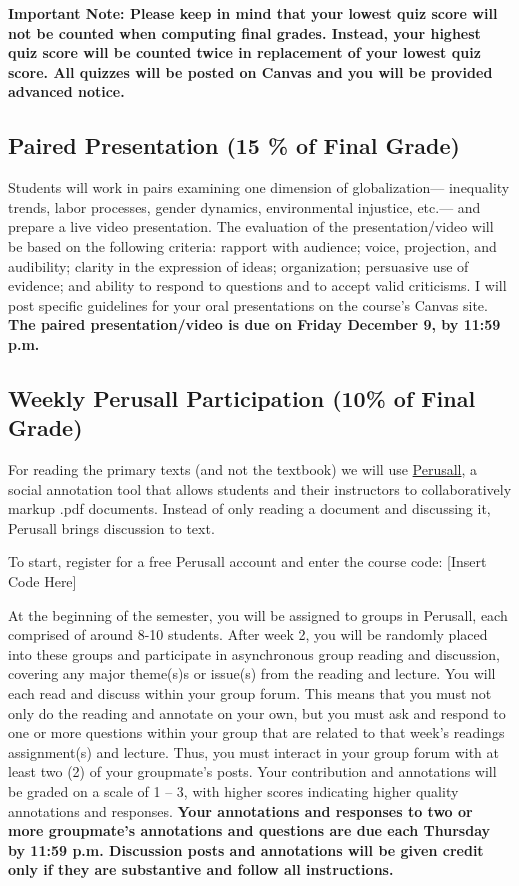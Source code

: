 \documentclass[11pt,]{article}
\begin{document}
\textbf{Important Note: Please keep in mind that your lowest quiz score
will not be counted when computing final grades. Instead, your highest
quiz score will be counted twice in replacement of your lowest quiz
score. All quizzes will be posted on Canvas and you will be provided
advanced notice.}

\hypertarget{paired-presentation-15-of-final-grade}{%
\subsection{Paired Presentation (15 \% of Final
Grade)}\label{paired-presentation-15-of-final-grade}}

Students will work in pairs examining one dimension of globalization---
inequality trends, labor processes, gender dynamics, environmental
injustice, etc.--- and prepare a live video presentation. The evaluation
of the presentation/video will be based on the following criteria:
rapport with audience; voice, projection, and audibility; clarity in the
expression of ideas; organization; persuasive use of evidence; and
ability to respond to questions and to accept valid criticisms. I will
post specific guidelines for your oral presentations on the course's
Canvas site. \textbf{The paired presentation/video is due on Friday
December 9, by 11:59 p.m.}

\hypertarget{perusall}{%
\subsection{Weekly Perusall Participation (10\% of Final
Grade)}\label{perusall}}

For reading the primary texts (and not the textbook) we will use
\href{https://support.perusall.com/hc/en-us}{Perusall}, a social
annotation tool that allows students and their instructors to
collaboratively markup .pdf documents. Instead of only reading a
document and discussing it, Perusall brings discussion to text.

To start, register for a free Perusall account and enter the course
code: {[}Insert Code Here{]}

At the beginning of the semester, you will be assigned to groups in
Perusall, each comprised of around 8-10 students. After week 2, you will
be randomly placed into these groups and participate in asynchronous
group reading and discussion, covering any major theme(s)s or issue(s)
from the reading and lecture. You will each read and discuss within your
group forum. This means that you must not only do the reading and
annotate on your own, but you must ask and respond to one or more
questions within your group that are related to that week's readings
assignment(s) and lecture. Thus, you must interact in your group forum
with at least two (2) of your groupmate's posts. Your contribution and
annotations will be graded on a scale of 1 -- 3, with higher scores
indicating higher quality annotations and responses. \textbf{Your
annotations and responses to two or more groupmate's annotations and
questions are due each Thursday by 11:59 p.m. Discussion posts and
annotations will be given credit only if they are substantive and follow
all instructions.}
\end{document}
